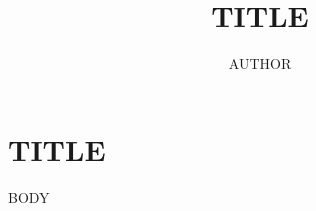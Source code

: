 \documentclass[aspectratio=43,UTF8,12pt,fontset=none]{ctexbeamer}
\title{ {{TITLE}} }
\author{ {{AUTHOR}} }
\date{}
\begin{document}
\begin{frame}
\titlepage
\end{frame}
\section[A]{ {{TITLE}} }
{{BODY}}
\end{document}
